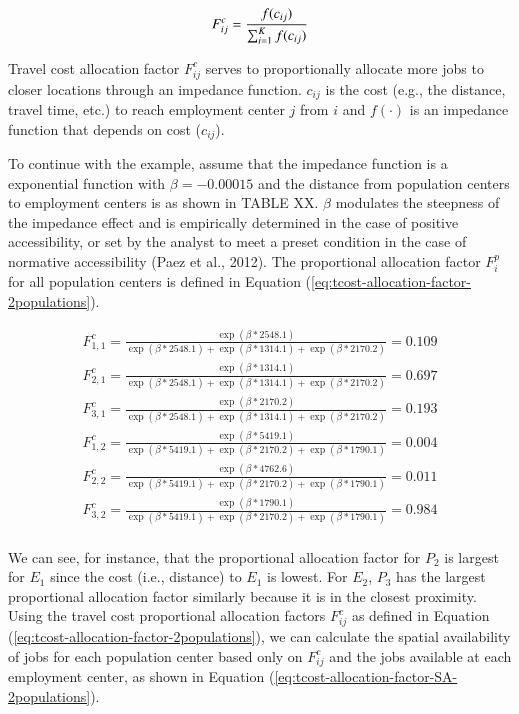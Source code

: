 \documentclass[]{elsarticle} %
\begin{document}
\begin{equation}
\label{eq:tcost-alloc-factor}
F^c_{ij} = \frac{f(c_{ij})}{\sum_{i=1}^K f(c_{ij})}\\
\end{equation}

Travel cost allocation factor \(F^c_{ij}\) serves to proportionally
allocate more jobs to closer locations through an impedance function.
\(c_{ij}\) is the cost (e.g., the distance, travel time, etc.) to reach
employment center \(j\) from \(i\) and \(f(\cdot)\) is an impedance
function that depends on cost (\(c_{ij}\)).

To continue with the example, assume that the impedance function is a
exponential function with \(\beta=-0.00015\) and the distance from
population centers to employment centers is as shown in TABLE XX.
\(\beta\) modulates the steepness of the impedance effect and is
empirically determined in the case of positive accessibility, or set by
the analyst to meet a preset condition in the case of normative
accessibility (Paez et al., 2012). The proportional allocation factor
\(F^p_{i}\) for all population centers is defined in Equation
(\ref{eq:tcost-allocation-factor-2populations}).

\begin{equation}
\label{eq:tcost-allocation-factor-2populations}
\begin{array}{l}
F^c_{1,1} = \frac{\exp(\beta*2548.1)}{\exp(\beta *2548.1) + \exp(\beta *1314.1) + \exp(\beta *2170.2)} = 0.109\\
F^c_{2,1} = \frac{\exp(\beta *1314.1)}{\exp(\beta *2548.1) + \exp(\beta *1314.1) + \exp(\beta *2170.2)} = 0.697\\
F^c_{3,1} = \frac{\exp(\beta *2170.2)}{\exp(\beta *2548.1) + \exp(\beta *1314.1) + \exp(\beta *2170.2)} = 0.193\\
F^c_{1,2} = \frac{\exp(\beta*5419.1)}{\exp(\beta *5419.1) + \exp(\beta *2170.2) + \exp(\beta *1790.1)} = 0.004\\
F^c_{2,2} = \frac{\exp(\beta *4762.6)}{\exp(\beta *5419.1) + \exp(\beta *2170.2) + \exp(\beta *1790.1)} = 0.011\\
F^c_{3,2} = \frac{\exp(\beta *1790.1)}{\exp(\beta *5419.1) + \exp(\beta *2170.2) + \exp(\beta *1790.1)} = 0.984\\
\end{array}
\end{equation}

We can see, for instance, that the proportional allocation factor for
\(P_2\) is largest for \(E_1\) since the cost (i.e., distance) to
\(E_1\) is lowest. For \(E_2\), \(P_3\) has the largest proportional
allocation factor similarly because it is in the closest proximity.
Using the travel cost proportional allocation factors \(F^c_{ij}\) as
defined in Equation (\ref{eq:tcost-allocation-factor-2populations}), we
can calculate the spatial availability of jobs for each population
center based only on \(F^c_{ij}\) and the jobs available at each
employment center, as shown in Equation
(\ref{eq:tcost-allocation-factor-SA-2populations}).
\end{document}
